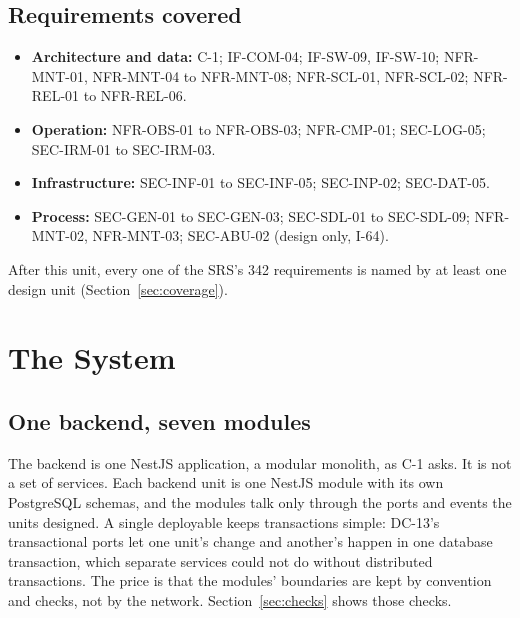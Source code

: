 \documentclass[11pt,a4paper]{article}
\begin{document}
\subsection{Requirements covered}
\begin{itemize}[nosep]
  \item \textbf{Architecture and data:} C-1; IF-COM-04; IF-SW-09, IF-SW-10; NFR-MNT-01, NFR-MNT-04 to NFR-MNT-08; NFR-SCL-01, NFR-SCL-02; NFR-REL-01 to NFR-REL-06.
  \item \textbf{Operation:} NFR-OBS-01 to NFR-OBS-03; NFR-CMP-01; SEC-LOG-05; SEC-IRM-01 to SEC-IRM-03.
  \item \textbf{Infrastructure:} SEC-INF-01 to SEC-INF-05; SEC-INP-02; SEC-DAT-05.
  \item \textbf{Process:} SEC-GEN-01 to SEC-GEN-03; SEC-SDL-01 to SEC-SDL-09; NFR-MNT-02, NFR-MNT-03; SEC-ABU-02 (design only, I-64).
\end{itemize}
After this unit, every one of the SRS's 342 requirements is named by at least one design unit (Section~\ref{sec:coverage}).

\section{The System}
\label{sec:system}

\subsection{One backend, seven modules}
The backend is one NestJS application, a modular monolith, as C-1 asks. It is not a set of services. Each backend unit is one NestJS module with its own PostgreSQL schemas, and the modules talk only through the ports and events the units designed. A single deployable keeps transactions simple: DC-13's transactional ports let one unit's change and another's happen in one database transaction, which separate services could not do without distributed transactions. The price is that the modules' boundaries are kept by convention and checks, not by the network. Section~\ref{sec:checks} shows those checks.
\end{document}
